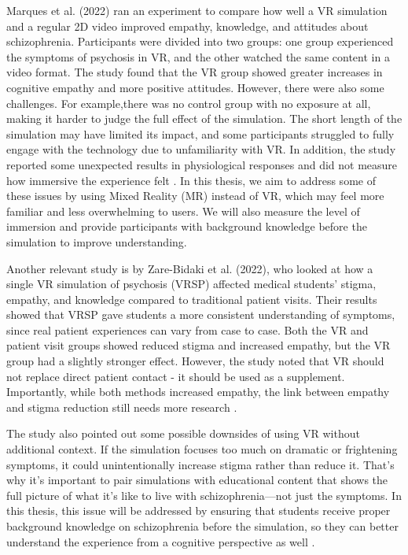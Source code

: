 Marques et al. (2022) ran an experiment to compare how well a VR simulation and a regular 2D video improved empathy, knowledge, and attitudes about schizophrenia. Participants were divided into two groups: one group experienced the symptoms of psychosis in VR, and the other watched the same content in a video format. The study found that the VR group showed greater increases in cognitive empathy and more positive attitudes. However, there were also some challenges. For example,there was no control group with no exposure at all, making it harder to judge the full effect of the simulation. The short length of the simulation may have limited its impact, and some participants struggled to fully engage with the technology due to unfamiliarity with VR. In addition, the study reported some unexpected results in physiological responses and did not measure how immersive the experience felt \cite{Marques2022}. In this thesis, we aim to address some of these issues by using Mixed Reality (MR) instead of VR, which may feel more familiar and less overwhelming to users. We will also measure the level of immersion and provide participants with background knowledge before the simulation to improve understanding. %

Another relevant study is by Zare-Bidaki et al. (2022), who looked at how a single VR simulation of psychosis (VRSP) affected medical students' stigma, empathy, and knowledge compared to traditional patient visits. Their results showed that VRSP gave students a more consistent understanding of symptoms, since real patient experiences can vary from case to case. Both the VR and patient visit groups showed reduced stigma and increased empathy, but the VR group had a slightly stronger effect. However, the study noted that VR should not replace direct patient contact - it should be used as a supplement. %
Importantly, while both methods increased empathy, the link between empathy and stigma reduction still needs more research \cite{Zare-Bidaki2022}.

The study also pointed out some possible downsides of using VR without additional context. If the simulation focuses too much on dramatic or frightening symptoms, it could unintentionally increase stigma rather than reduce it. That's why it's important to pair simulations with educational content that shows the full picture of what it's like to live with schizophrenia—not just the symptoms. In this thesis, this issue will be addressed by ensuring that students receive proper background knowledge on schizophrenia before the simulation, so they can better understand the experience from a cognitive perspective as well \cite{Zare-Bidaki2022}.

